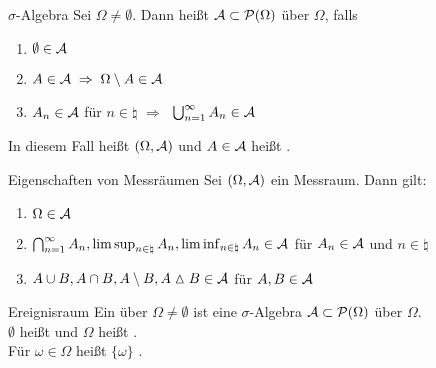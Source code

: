 \begin{Def}{$\sigma$-Algebra}
    Sei $\Omega \not= \emptyset$.
    Dann heißt $\mathcal{A} \subset \mathcal{P}(\Omega)$  über $\Omega$, falls
    \begin{enumerate}
        \item
        $\emptyset \in \mathcal{A}$
        
        \item
        $A \in \mathcal{A} \;\Rightarrow\; \Omega \setminus A \in \mathcal{A}$
        
        \item
        $A_n \in \mathcal{A}$ für $n \in \natural$ $\Rightarrow\;$ $\bigcup_{n=1}^\infty A_n \in \mathcal{A}$
    \end{enumerate}
    In diesem Fall heißt $(\Omega, \mathcal{A})$  und $A \in \mathcal{A}$ heißt .
\end{Def}

\begin{Satz}{Eigenschaften von Messräumen}
    Sei $(\Omega, \mathcal{A})$ ein Messraum.
    Dann gilt:
    \begin{enumerate}
        \item
        $\Omega \in \mathcal{A}$
        
        \item
        $\bigcap_{n=1}^\infty A_n, \limsup_{n \in \natural} A_n,
        \liminf_{n \in \natural} A_n \in \mathcal{A}$
        für $A_n \in \mathcal{A}$ und $n \in \natural$
        
        \item
        $A \cup B, A \cap B, A \setminus B, A \vartriangle B \in \mathcal{A}$ für $A, B \in \mathcal{A}$
    \end{enumerate}
\end{Satz}

\linie
\pagebreak

\begin{Def}{Ereignisraum}
    Ein  über $\Omega \not= \emptyset$ ist eine $\sigma$-Algebra
    $\mathcal{A} \subset \mathcal{P}(\Omega)$ über $\Omega$.\\
    $\emptyset$ heißt  und
    $\Omega$ heißt .\\
    Für $\omega \in \Omega$ heißt $\{\omega\}$ .
\end{Def}

